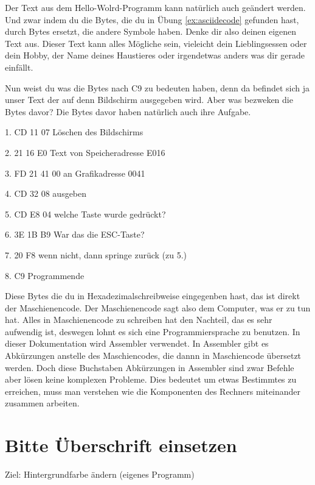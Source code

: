 \documentclass[10pt]{book}
\begin{document}
\begin{Exercise}[label=ex:asciiencode]
Der Text aus dem Hello-Wolrd-Programm
kann natürlich auch ge\-än\-dert werden.
Und zwar indem du die Bytes,
die du in Übung \ref{ex:asciidecode} gefunden hast,
durch Bytes ersetzt, die andere Symbole haben.
Denke dir also deinen eigenen Text aus.
Dieser Text kann alles Mögliche sein,
vieleicht dein Lieblingsessen oder dein Hobby,
der Name deines Haustieres
oder irgendetwas anders was dir gerade einfällt.
\end{Exercise}

Nun weist du was die Bytes nach C9 zu bedeuten haben,
denn da befindet sich ja unser Text der auf denn Bildschirm ausgegeben wird.
Aber was bezweken die Bytes davor? Die Bytes davor haben natürlich auch ihre Aufgabe.

1. CD 11 07		Löschen des Bildschirms

2. 21 16 E0		Text von Speicheradresse E016

3. FD 21 41 00		an Grafikadresse 0041

4. CD 32 08		ausgeben

5. CD E8 04		welche Taste wurde gedrückt?

6. 3E 1B B9		War das die ESC-Taste?

7. 20 F8		wenn nicht, dann springe zurück (zu 5.)

8. C9			Programmende


Diese Bytes die du in Hexadezimalschreibweise
eingegenben hast, das ist direkt der Maschienencode.
Der Maschienencode sagt also dem Computer,
was er zu tun hat. Alles in Maschienencode zu schreiben
hat den Nachteil, das es sehr aufwendig ist,
deswegen lohnt es sich eine Programmiersprache zu benutzen.
In dieser Dokumentation wird Assembler verwendet.
In Assembler gibt es Abkürzungen
anstelle des Maschiencodes,
die dannn in Maschiencode übersetzt werden.
Doch diese Buchstaben Abkürzungen in Assembler
sind zwar Befehle aber lösen keine komplexen Probleme.
Dies bedeutet um etwas Bestimmtes zu erreichen,
muss man verstehen wie die Komponenten
des Rechners miteinander zusammen arbeiten.

\section{Bitte Überschrift einsetzen}

Ziel: Hintergrundfarbe ändern (eigenes Programm)
\end{document}
